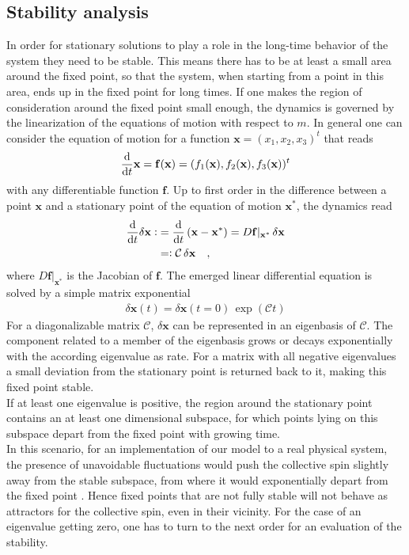 \subsection{Stability analysis}\label{sec:stab_anal_zero}
In order for stationary solutions to play a role in the long-time behavior of the system they need to be stable. This means there has to be at least a small area around the fixed point, so that the system, when starting from a point in this area, ends up in the fixed point for long times. If one makes the region of consideration around the fixed point small enough, the dynamics is governed by the linearization of the equations of motion with respect to $m$. In general one can consider the equation of motion for a function $\mathbf{x}=(x_1,x_2,x_3)^t$ that reads
\begin{align*}
    \frac{\text{d}}{\text{d}t} \mathbf{x}=\mathbf{f}(\mathbf{x})=(f_1(\mathbf{x}),f_2(\mathbf{x}),f_3(\mathbf{x}))^t
\end{align*}
with any differentiable function $\mathbf{f}$. Up to first order in the difference between a point $\mathbf{x}$ and a stationary point of the equation of motion $\mathbf{x}^*$, the dynamics read 
\begin{align*}
    \frac{\text{d}}{\text{d}t} \delta\mathbf{x} \vcentcolon&= \frac{\text{d}}{\text{d}t}\,(\mathbf{x}-\mathbf{x}^*)=D\mathbf{f}|_{\mathbf{x}^*}\,\delta\mathbf{x}\\
    &=\vcentcolon\mathcal{C}\,\delta\mathbf{x}\quad,
\end{align*}
where $D\mathbf{f}|_{\mathbf{x}^*}$ is the Jacobian of $\mathbf{f}$. The emerged linear differential equation is solved by a simple matrix exponential
\begin{align*}
    \delta\mathbf{x}(t)=\delta\mathbf{x}(t=0)\,\exp(\mathcal{C}t)
\end{align*}
For a diagonalizable matrix $\mathcal{C}$, $\delta\mathbf{x}$ can be represented in an eigenbasis of $\mathcal{C}$. The component related to a member of the eigenbasis grows or decays exponentially with the according eigenvalue as rate. For a matrix with all negative eigenvalues a small deviation from the stationary point is returned back to it, making this fixed point stable. \\If at least one eigenvalue is positive, the region around the stationary point contains an at least one dimensional subspace, for which points lying on this subspace depart from the fixed point with growing time. \\In this scenario, for an implementation of our model to a real physical system, the presence of unavoidable fluctuations would push the collective spin slightly away from the stable subspace, from where it would exponentially depart from the fixed point \cite{pikovskij_synchronization_2007}. Hence fixed points that are not fully stable will not behave as attractors for the collective spin, even in their vicinity. For the case of an eigenvalue getting zero, one has to turn to the next order for an evaluation of the stability.\\\\
